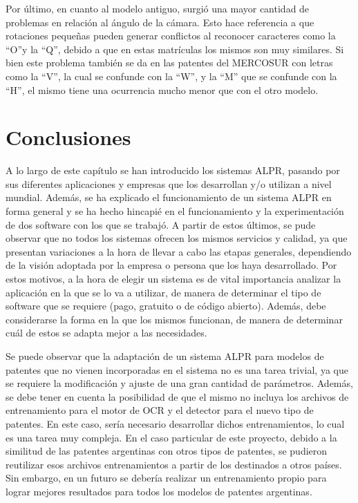 Por último, en cuanto al modelo antiguo, surgió una mayor cantidad de problemas en relación al ángulo de la cámara. Esto hace referencia a que rotaciones pequeñas pueden generar conflictos al reconocer caracteres como la ``O''y la ``Q'', debido a que en estas matrículas los mismos son muy similares. Si bien este problema también se da en las patentes del MERCOSUR con letras como la ``V'', la cual se confunde con la ``W'', y la ``M'' que se confunde con la ``H'', el mismo tiene una ocurrencia mucho menor que con el otro modelo.


\section{Conclusiones}
	
A lo largo de este capítulo se han introducido los sistemas ALPR, pasando por sus diferentes aplicaciones y empresas que los desarrollan y/o utilizan a nivel mundial. Además, se ha explicado el funcionamiento de un sistema ALPR en forma general y se ha hecho hincapié en el funcionamiento y la experimentación de dos software con los que se trabajó. A partir de estos últimos, se pude observar que no todos los sistemas ofrecen los mismos servicios y calidad, ya que presentan variaciones a la hora de llevar a cabo las etapas generales, dependiendo de la visión adoptada por la empresa o persona que los haya desarrollado. Por estos motivos, a la hora de elegir un sistema es de vital importancia analizar la aplicación en la que se lo va a utilizar, de manera de determinar el tipo de software que se requiere (pago, gratuito o de código abierto). Además, debe considerarse la forma en la que los mismos funcionan, de manera de determinar cuál de estos se adapta mejor a las necesidades. 

Se puede observar que la adaptación de un sistema ALPR para modelos de patentes que no vienen incorporadas en el sistema no es una tarea trivial, ya que se requiere la modificación y ajuste de una gran cantidad de parámetros. Además, se debe tener en cuenta la posibilidad de que el mismo no incluya los archivos de entrenamiento para el motor de OCR y el detector para el nuevo tipo de patentes. En este caso, sería necesario desarrollar dichos entrenamientos, lo cual es una tarea muy compleja. En el caso particular de este proyecto, debido a la similitud de las patentes argentinas con otros tipos de patentes, se pudieron reutilizar esos archivos entrenamientos a partir de los destinados a otros países. Sin embargo, en un futuro se debería realizar un entrenamiento propio para lograr mejores resultados para todos los modelos de patentes argentinas.





















